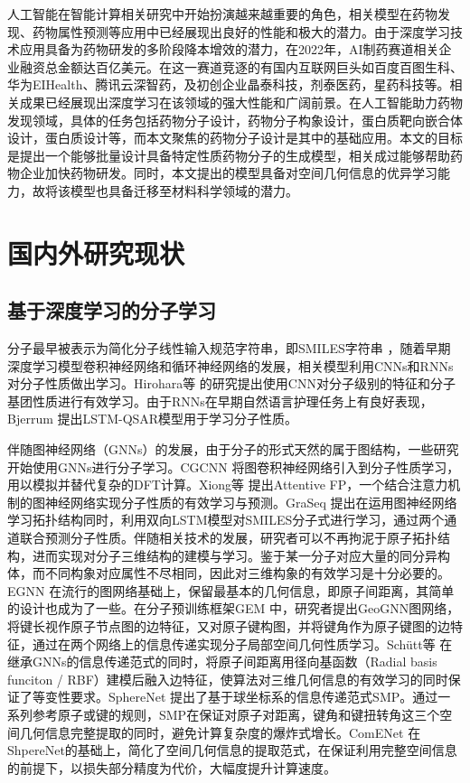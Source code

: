 人工智能在智能计算相关研究中开始扮演越来越重要的角色，相关模型在药物发现、药物属性预测等应用中已经展现出良好的性能和极大的潜力。由于深度学习技术应用具备为药物研发的多阶段降本增效的潜力，在2022年，AI制药赛道相关企业融资总金额达百亿美元。在这一赛道竞逐的有国内互联网巨头如百度百图生科、华为EIHealth、腾讯云深智药，及初创企业晶泰科技，剂泰医药，星药科技等。相关成果已经展现出深度学习在该领域的强大性能和广阔前景。在人工智能助力药物发现领域，具体的任务包括药物分子设计，药物分子构象设计，蛋白质靶向嵌合体设计，蛋白质设计等，而本文聚焦的药物分子设计是其中的基础应用。本文的目标是提出一个能够批量设计具备特定性质药物分子的生成模型，相关成过能够帮助药物企业加快药物研发。同时，本文提出的模型具备对空间几何信息的优异学习能力，故将该模型也具备迁移至材料科学领域的潜力。

\section{国内外研究现状}
\subsection{基于深度学习的分子学习}
分子最早被表示为简化分子线性输入规范字符串，即SMILES字符串  \cite{smiles_weinberger_88}，随着早期深度学习模型卷积神经网络和循环神经网络的发展，相关模型利用CNNs和RNNs对分子性质做出学习。Hirohara等 \cite{cnnsmiles_hirohara_18}的研究提出使用CNN对分子级别的特征和分子基团性质进行有效学习。由于RNNs在早期自然语言护理任务上有良好表现，Bjerrum \cite{rnnsmiles_bjerrum_17}提出LSTM-QSAR模型用于学习分子性质。

伴随图神经网络（GNNs）的发展，由于分子的形式天然的属于图结构，一些研究开始使用GNNs进行分子学习。CGCNN \cite{cgcnn_xie_18}将图卷积神经网络引入到分子性质学习，用以模拟并替代复杂的DFT计算。Xiong等 \cite{attentivefp_xiong_20}提出Attentive FP，一个结合注意力机制的图神经网络实现分子性质的有效学习与预测。GraSeq \cite{graseq_guo_20}提出在运用图神经网络学习拓扑结构同时，利用双向LSTM模型对SMILES分子式进行学习，通过两个通道联合预测分子性质。伴随相关技术的发展，研究者可以不再拘泥于原子拓扑结构，进而实现对分子三维结构的建模与学习。鉴于某一分子对应大量的同分异构体，而不同构象对应属性不尽相同，因此对三维构象的有效学习是十分必要的。EGNN \cite{egnn_satorras_21}在流行的图网络基础上，保留最基本的几何信息，即原子间距离，其简单的设计也成为了一些。在分子预训练框架GEM \cite{gem_fang_22}中，研究者提出GeoGNN图网络，将键长视作原子节点图的边特征，又对原子键构图，并将键角作为原子键图的边特征，通过在两个网络上的信息传递实现分子局部空间几何性质学习。Sch\"{u}tt等 \cite{schnet_schutt_17}在继承GNNs的信息传递范式的同时，将原子间距离用径向基函数（Radial basis funciton / RBF）建模后融入边特征，使算法对三维几何信息的有效学习的同时保证了等变性要求。SphereNet \cite{spherenet_liu_22}提出了基于球坐标系的信息传递范式SMP。通过一系列参考原子或键的规则，SMP在保证对原子对距离，键角和键扭转角这三个空间几何信息完整提取的同时，避免计算复杂度的爆炸式增长。ComENet \cite{comenet_wang_22}在ShpereNet的基础上，简化了空间几何信息的提取范式，在保证利用完整空间信息的前提下，以损失部分精度为代价，大幅度提升计算速度。

